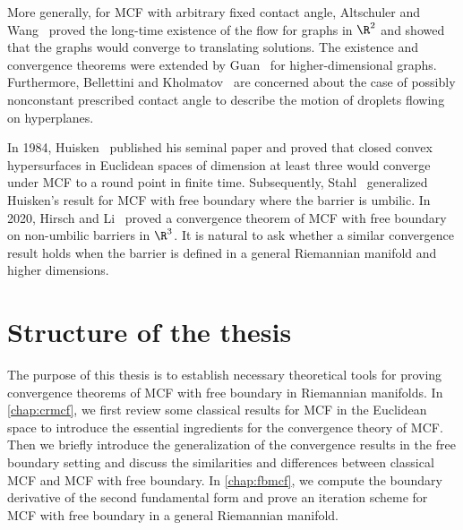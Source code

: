 More generally, for MCF with arbitrary fixed contact angle, Altschuler and Wang~\cite{altschuler_translating_1994} proved the long-time existence of the flow for graphs in $\R^2$ and showed that the graphs would converge to translating solutions. The existence and convergence theorems were extended by Guan~\cite{guan1996mean} for higher-dimensional graphs. Furthermore, Bellettini and Kholmatov~\cite{bellettini_minimizing_2018} are concerned about the case of possibly nonconstant prescribed contact angle to describe the motion of droplets flowing on hyperplanes.
 
In 1984, Huisken~\cite{huisken_flow_1984} published his seminal paper and proved that closed convex hypersurfaces in Euclidean spaces of dimension at least three would converge under MCF to a round point in finite time. Subsequently, Stahl~\cite{stahl_convergence_1996} generalized Huisken's result for MCF with free boundary where the barrier is umbilic. In 2020, Hirsch and Li~\cite{hirsch2020contracting} proved a convergence theorem of MCF with free boundary on non-umbilic barriers in $\R^3$. It is natural to ask whether a similar convergence result holds when the barrier is defined in a general Riemannian manifold and higher dimensions.

\section{Structure of the thesis}

The purpose of this thesis is to establish necessary theoretical tools for proving convergence theorems of MCF with free boundary in Riemannian manifolds. In \autoref{chap:crmcf}, we first review some classical results for MCF in the Euclidean space to introduce the essential ingredients for the convergence theory of MCF. Then we briefly introduce the generalization of the convergence results in the free boundary setting and discuss the similarities and differences between classical MCF and MCF with free boundary. In \autoref{chap:fbmcf}, we compute the boundary derivative of the second fundamental form and prove an iteration scheme for MCF with free boundary in a general Riemannian manifold.

\chapterend